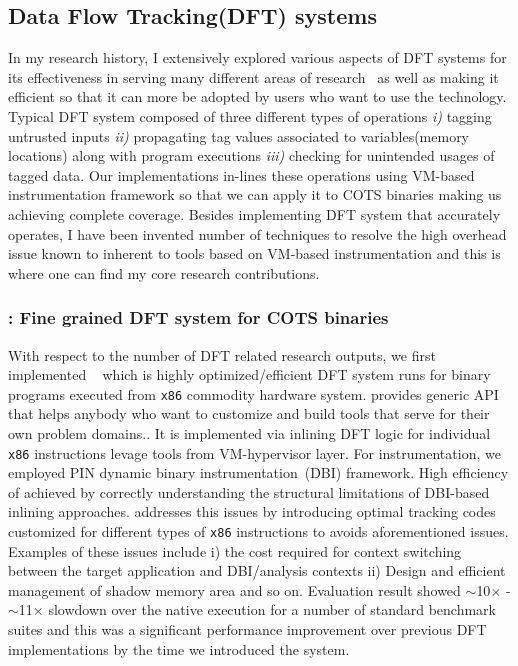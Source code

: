 \documentclass[letterpaper, 10pt]{article}
\begin{document}
\begin{small}
\subsection*{Data Flow Tracking(DFT) systems} 
%
In my research history, I extensively explored various aspects of DFT systems
for its effectiveness in serving many different areas of
research~\cite{libdft:2012vee, tfa:2012ndss, sreplica:2013ccs} as well as
making it efficient so that it can more be adopted by users who want to use the
technology.
%
Typical DFT system composed of three different types of operations {\it i)}
tagging untrusted inputs {\it ii)} propagating tag values associated to
variables(memory locations) along with program executions {\it iii)} checking
for unintended usages of tagged data. Our implementations in-lines these
operations using VM-based instrumentation framework so that we can apply it to
COTS binaries making us achieving complete coverage.
%
Besides implementing DFT system that accurately operates, I have been invented
number of techniques to resolve the high overhead issue known to inherent to
tools based on VM-based instrumentation and this is where one can find my core
research contributions.

\subsubsection*{\libdft: Fine grained DFT system for COTS binaries}
With respect to the number of DFT related research outputs, we first
implemented \libdft~\cite{libdft:2012vee} which is highly optimized/efficient
DFT system runs for binary programs executed from {\tt x86} commodity hardware
system. \libdft provides generic API that helps anybody who want to customize
and build tools that serve for their own problem domains..
%
It is implemented via inlining DFT logic for individual {\tt x86} instructions
 levage tools from VM-hypervisor layer. For
instrumentation, we employed PIN dynamic binary instrumentation~(DBI)
framework. High efficiency of \libdft achieved by correctly understanding the
structural limitations of DBI-based inlining approaches. \libdft addresses this
issues by introducing optimal tracking codes customized for different types of
{\tt x86} instructions to avoids aforementioned issues. Examples of these
issues include i) the cost required for context switching between the target
application and DBI/analysis contexts ii) Design and efficient management of
shadow memory area and so on. 
%
Evaluation result showed $\sim$10$\times$ - $\sim$11$\times$ slowdown over the
native execution for a number of standard benchmark suites and this was a
significant performance improvement over previous DFT implementations by the
time we introduced the system.


\end{small}
\end{document}
